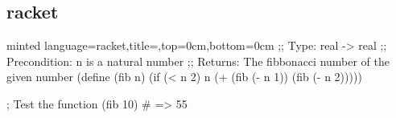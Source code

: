 \documentclass[
    ngerman,
    accentcolor=3b,
    fontsize=12pt,
    a4paper,
    aspectratio=169,
    colorback=true,
    fancy_row_colors,
    leqno,
    fleqn,
    boxarc,
    fleqn,
]{algoslides}
\begin{document}
    \subsection{racket}
    \begin{frame}[fragile,c]
        \slidehead{}
        \begin{codeBlock}[]{minted language=racket,title=,top=0cm,bottom=0cm}
        ;; Type: real -> real
        ;; Precondition: n is a natural number
        ;; Returns: The fibbonacci number of the given number
        (define (fib n)
            (if (< n 2)
                n
                (+ (fib (- n 1)) (fib (- n 2)))))

        ; Test the function
        (fib 10) # => 55
    \end{codeBlock}
    \end{frame}
\end{document}
